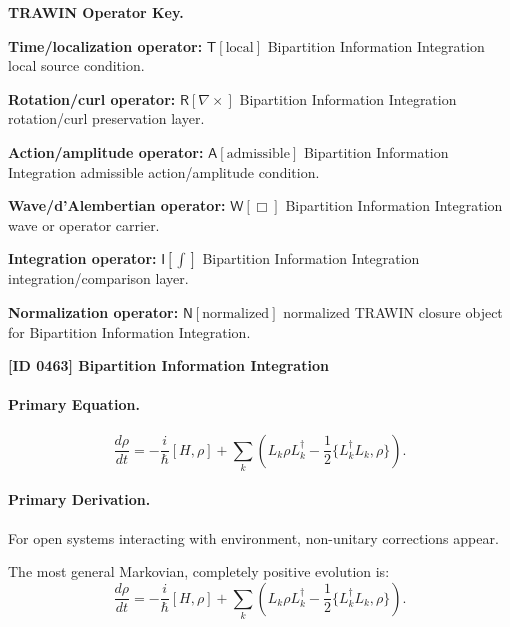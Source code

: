 \par\vspace{0.45\baselineskip}
\noindent\begin{minipage}[t]{\linewidth}
\begingroup
\small
\raggedright
\textbf{TRAWIN Operator Key.}\par
\noindent\textbf{Time/localization operator:} $\mathsf{T}\!\left[\mathrm{local}\right]$ Bipartition Information Integration local source condition.\par
\noindent\textbf{Rotation/curl operator:} $\mathsf{R}\!\left[\nabla\times\right]$ Bipartition Information Integration rotation/curl preservation layer.\par
\noindent\textbf{Action/amplitude operator:} $\mathsf{A}\!\left[\mathrm{admissible}\right]$ Bipartition Information Integration admissible action/amplitude condition.\par
\noindent\textbf{Wave/d'Alembertian operator:} $\mathsf{W}\!\left[\Box\right]$ Bipartition Information Integration wave or operator carrier.\par
\noindent\textbf{Integration operator:} $\mathsf{I}\!\left[\int\right]$ Bipartition Information Integration integration/comparison layer.\par
\noindent\textbf{Normalization operator:} $\mathsf{N}\!\left[\mathrm{normalized}\right]$ normalized TRAWIN closure object for Bipartition Information Integration.\par
\endgroup
\end{minipage}

\clearpage
\noindent\textbf{[ID 0463] Bipartition Information Integration}\par
\vspace{0.35em}
\paragraph{Primary Equation.}
\begin{equation}
\frac{d\rho}{dt}
=
-\frac{i}{\hbar}[H,\rho]
+
\sum_k
\left(
L_k \rho L_k^\dagger
-
\frac{1}{2}
\{L_k^\dagger L_k,\rho\}
\right).
\end{equation}

\paragraph{Primary Derivation.}
For open systems interacting with environment, non-unitary corrections appear.

The most general Markovian, completely positive evolution is:
\begin{equation}
\boxed{
\frac{d\rho}{dt}
=
-\frac{i}{\hbar}[H,\rho]
+
\sum_k
\left(
L_k \rho L_k^\dagger
-
\frac{1}{2}
\{L_k^\dagger L_k,\rho\}
\right).
}
\end{equation}

